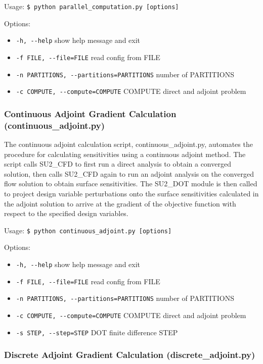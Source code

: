 \documentclass[12pt, a4paper, twoside]{article}
\begin{document}
Usage: \verb|$ python parallel_computation.py [options]|

Options:

\begin{itemize}
    \item \verb|-h, --help| show help message and exit
    \item \verb|-f FILE, --file=FILE| read config from FILE
    \item \verb|-n PARTITIONS, --partitions=PARTITIONS| number of PARTITIONS
    \item \verb|-c COMPUTE, --compute=COMPUTE| COMPUTE direct and adjoint problem
\end{itemize}
    

\subsubsection{Continuous Adjoint Gradient Calculation (continuous\_adjoint.py)}

The continuous adjoint calculation script, continuous\_adjoint.py, automates the procedure for calculating sensitivities using a continuous adjoint method. The script calls SU2\_CFD to first run a direct analysis to obtain a converged solution, then calls SU2\_CFD again to run an adjoint analysis on the converged flow solution to obtain surface sensitivities. The SU2\_DOT module is then called to project design variable perturbations onto the surface sensitivities calculated in the adjoint solution to arrive at the gradient of the objective function with respect to the specified design variables.

Usage: \verb|$ python continuous_adjoint.py [options]|

Options:

\begin{itemize}
    \item \verb|-h, --help| show help message and exit
    \item \verb|-f FILE, --file=FILE| read config from FILE
    \item \verb|-n PARTITIONS, --partitions=PARTITIONS| number of PARTITIONS
    \item \verb|-c COMPUTE, --compute=COMPUTE| COMPUTE direct and adjoint problem
    \item \verb|-s STEP, --step=STEP| DOT finite difference STEP
\end{itemize}
    

\subsubsection{Discrete Adjoint Gradient Calculation (discrete\_adjoint.py)}
\end{document}
